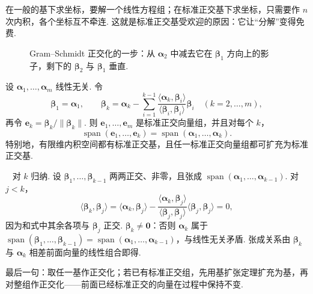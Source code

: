 \documentclass[lang=cn,10.5pt,scheme=chinese,toc=twocol,section,chinesefont=nofont,
twoside,citestyle=gb7714-2015,bibstyle=gb7714-2015]{elegantbook}
\DeclareRobustCommand{\textbf}[1]{{\lnsemiboldlatin\lnsemiboldcjk #1}}
\newcommand{\vv}[1]{\boldsymbol{#1}}
\newcommand{\zero}{\boldsymbol{0}}          %
\numberwithin{equation}{section}   %
\newcommand{\spn}{\operatorname{span}}      %
\newcommand*{\lnlabel}[1]{{\sffamily\bfseries\color{black}#1}}
\renewenvironment{proof}{%
	\par\noindent\lnlabel{\proofname}\;\ \color{black!90}\cfs}{\par}
\begin{document}
\begin{motivebox}
  在一般的基下求坐标，要解一个线性方程组；在标准正交基下求坐标，只需要作 $n$ 次内积，各个坐标互不牵连. 这就是标准正交基受欢迎的原因：\textbf{它让“分解”变得免费}.
\end{motivebox}
\begin{figure}[htbp]
  \centering
  \caption{Gram–Schmidt 正交化的一步：从 $\vv\alpha_2$ 中减去它在 $\vv\beta_1$ 方向上的影子，剩下的 $\vv\beta_2$ 与 $\vv\beta_1$ 垂直.}
  \label{fig:gramschmidt}
\end{figure}
\begin{theorem}\label{thm:gramschmidt}
  设 $\vv\alpha_1,\ldots,\vv\alpha_m$ 线性无关. 令
  \[\vv\beta_1=\vv\alpha_1,\qquad \vv\beta_k=\vv\alpha_k-\sum_{i=1}^{k-1}\frac{\langle\vv\alpha_k,\vv\beta_i\rangle}{\langle\vv\beta_i,\vv\beta_i\rangle}\vv\beta_i\quad(k=2,\ldots,m),\]
  再令 $\vv e_k=\vv\beta_k/\|\vv\beta_k\|$. 则 $\vv e_1,\ldots,\vv e_m$ 是标准正交向量组，并且对每个 $k$，
  \[\spn(\vv e_1,\ldots,\vv e_k)=\spn(\vv\alpha_1,\ldots,\vv\alpha_k).\]
  特别地，有限维内积空间都有标准正交基，且任一标准正交向量组都可扩充为标准正交基.
\end{theorem}
\begin{proof}
  对 $k$ 归纳. 设 $\vv\beta_1,\ldots,\vv\beta_{k-1}$ 两两正交、非零，且张成 $\spn(\vv\alpha_1,\ldots,\vv\alpha_{k-1})$. 对 $j<k$，
  \[\langle\vv\beta_k,\vv\beta_j\rangle=\langle\vv\alpha_k,\vv\beta_j\rangle-\frac{\langle\vv\alpha_k,\vv\beta_j\rangle}{\langle\vv\beta_j,\vv\beta_j\rangle}\langle\vv\beta_j,\vv\beta_j\rangle=0,\]
  因为和式中其余各项与 $\vv\beta_j$ 正交. $\vv\beta_k\ne\zero$：否则 $\vv\alpha_k$ 属于 $\spn(\vv\beta_1,\ldots,\vv\beta_{k-1})=\spn(\vv\alpha_1,\ldots,\vv\alpha_{k-1})$，与线性无关矛盾. 张成关系由 $\vv\beta_k$ 与 $\vv\alpha_k$ 相差前面向量的线性组合即得.

  最后一句：取任一基作正交化；若已有标准正交组，先用基扩张定理扩充为基，再对整组作正交化——前面已经标准正交的向量在过程中保持不变.
\end{proof}
\end{document}
